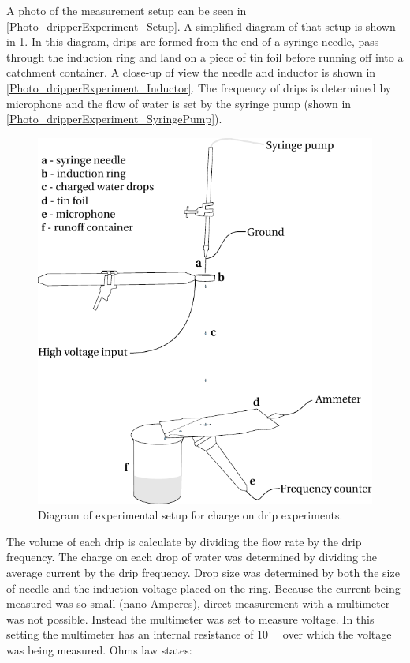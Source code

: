 A photo of the measurement setup can be seen in \cref{Photo_dripperExperiment_Setup}.
A simplified diagram of that setup is shown in \cref{ChargedDrips_Figure_Drawing_ExperimentalSetup}.
In this diagram, drips are formed from the end of a syringe needle, pass through the induction ring and land on a piece of tin foil before running off into a catchment container.
A close-up of view the needle and inductor is shown in \cref{Photo_dripperExperiment_Inductor}.
The frequency of drips is determined by microphone and the flow of water is set by the syringe pump (shown in \cref{Photo_dripperExperiment_SyringePump}).

\begin{figure}
    \centering
    \includegraphics[scale=0.9]{content/appendices/chargedWaterDrops/graphics/ChargedDrips_Figure_Drawing_ExperimentalSetup}
    \caption{\label{ChargedDrips_Figure_Drawing_ExperimentalSetup}Diagram of experimental setup for charge on drip experiments.}
\end{figure}

The volume of each drip is calculate by dividing the flow rate by the drip frequency.
The charge on each drop of water was determined by dividing the average current by the drip frequency.
Drop size was determined by both the size of needle and the induction voltage placed on the ring.
Because the current being measured was so small (nano Amperes), direct measurement with a multimeter was not possible.
Instead the multimeter was set to measure voltage.
In this setting the multimeter has an internal resistance of \SI{10}{\mega\Omega} over which the voltage was being measured.
Ohms law states:

